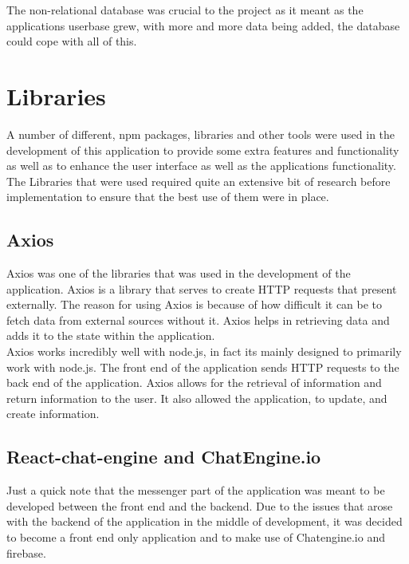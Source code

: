 The non-relational database was crucial to the project as it meant as the applications userbase grew, with more and more data being added, the database could cope with all of this.\cite{Neo4J3}\\

\section{Libraries}

A number of different, npm packages, libraries and other tools were used in the development of this application to provide some extra features and functionality as well as to enhance the user interface as well as the applications functionality. The Libraries that were used required quite an extensive bit of research before implementation to ensure that the best use of them were in place. \\

\subsection{Axios}

Axios was one of the libraries that was used in the development of the application. Axios is a library that serves to create HTTP requests that present externally.  The reason for using Axios is because of how difficult it can be to fetch data from external sources without it. Axios helps in retrieving data and adds it to the state within the application.\cite{Axios} \\

Axios works incredibly well with node.js, in fact its mainly designed to primarily work with node.js. The front end of the application sends HTTP requests to the back end of the application. Axios allows for the retrieval of information and return information to the user. It also allowed the application, to update, and create information. \\

\subsection{React-chat-engine and ChatEngine.io}

Just a quick note that the messenger part of the application was meant to be developed between the front end and the backend. Due to the issues that arose with the backend of the application in the middle of development, it was decided to become a front end only application and to make use of Chatengine.io and firebase. \\

